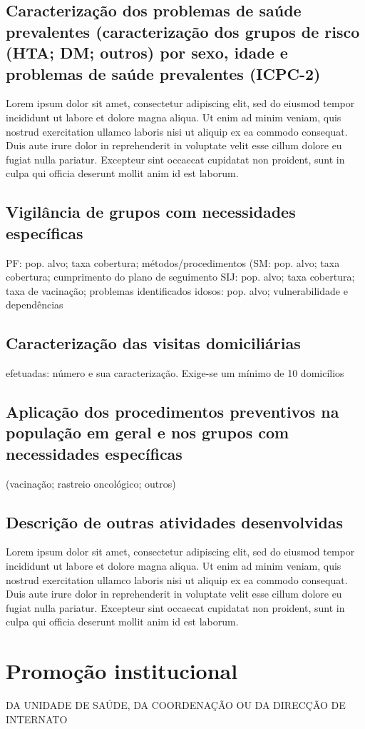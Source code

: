 \documentclass{report}
\begin{document}
\subsection{Caracterização dos problemas de saúde prevalentes (caracterização dos grupos de risco (HTA; DM; outros) por sexo, idade e problemas de saúde prevalentes (ICPC-2)}
Lorem ipsum dolor sit amet, consectetur adipiscing elit, sed do eiusmod tempor incididunt ut labore et dolore magna aliqua. Ut enim ad minim veniam, quis nostrud exercitation ullamco laboris nisi ut aliquip ex ea commodo consequat. Duis aute irure dolor in reprehenderit in voluptate velit esse cillum dolore eu fugiat nulla pariatur. Excepteur sint occaecat cupidatat non proident, sunt in culpa qui officia deserunt mollit anim id est laborum.
\subsection{Vigilância de grupos com necessidades específicas}
PF: pop. alvo; taxa cobertura; métodos/procedimentos
(SM: pop. alvo; taxa cobertura; cumprimento do plano de seguimento
SIJ: pop. alvo; taxa cobertura; taxa de vacinação; problemas identificados
idosos: pop. alvo; vulnerabilidade e dependências
\subsection{Caracterização das visitas domiciliárias}
efetuadas: número e sua caracterização. Exige-se um mínimo de 10 domicílios
\subsection{Aplicação dos procedimentos preventivos na população em geral e nos grupos com necessidades específicas}
(vacinação; rastreio oncológico; outros)
\subsection{Descrição de outras atividades desenvolvidas}
Lorem ipsum dolor sit amet, consectetur adipiscing elit, sed do eiusmod tempor incididunt ut labore et dolore magna aliqua. Ut enim ad minim veniam, quis nostrud exercitation ullamco laboris nisi ut aliquip ex ea commodo consequat. Duis aute irure dolor in reprehenderit in voluptate velit esse cillum dolore eu fugiat nulla pariatur. Excepteur sint occaecat cupidatat non proident, sunt in culpa qui officia deserunt mollit anim id est laborum.

\section{Promoção institucional}
DA UNIDADE DE SAÚDE, DA COORDENAÇÃO OU DA DIRECÇÃO DE INTERNATO
\end{document}
